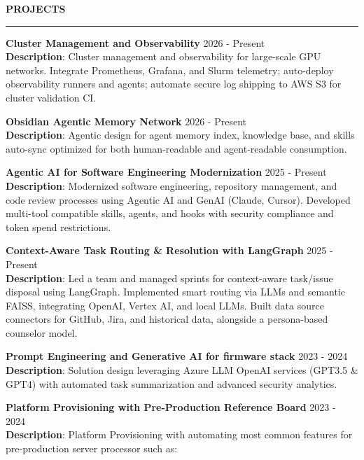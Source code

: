 \documentclass{resume} %
\renewenvironment{rSection}[1]{ %
  \sectionskip
  \textcolor{primaryColor}{\MakeUppercase{\bf #1}} %
  \sectionlineskip
  {\color{primaryColor}\hrule} %
  \begin{list}{}{ %
    \setlength{\leftmargin}{1.5em} %
  }
  \item[]
}{
  \end{list}
}
\begin{document}
\begin{rSection}{Projects}

{\textbf{\textcolor{accentColor}{Cluster Management and Observability}}} \hfill {2026 - Present}\\
\textbf{Description}: Cluster management and observability for large-scale GPU networks. Integrate Prometheus, Grafana, and Slurm telemetry; auto-deploy observability runners and agents; automate secure log shipping to AWS S3 for cluster validation CI.

{\textbf{\textcolor{accentColor}{Obsidian Agentic Memory Network}}} \hfill {2026 - Present}\\
\textbf{Description}: Agentic design for agent memory index, knowledge base, and skills auto-sync optimized for both human-readable and agent-readable consumption.

{\textbf{\textcolor{accentColor}{Agentic AI for Software Engineering Modernization}}} \hfill {2025 - Present}\\
\textbf{Description}: Modernized software engineering, repository management, and code review processes using Agentic AI and GenAI (Claude, Cursor). Developed multi-tool compatible skills, agents, and hooks with security compliance and token spend restrictions.

{\textbf{\textcolor{accentColor}{Context-Aware Task Routing \& Resolution with LangGraph}}} \hfill {2025 - Present}\\
\textbf{Description}: Led a team and managed sprints for context-aware task/issue disposal using LangGraph. Implemented smart routing via LLMs and semantic FAISS, integrating OpenAI, Vertex AI, and local LLMs. Built data source connectors for GitHub, Jira, and historical data, alongside a persona-based counselor model.

{\textbf{\textcolor{accentColor}{Prompt Engineering and Generative AI for firmware stack}}} \hfill {2023 - 2024}\\
\textbf{Description}: Solution design leveraging Azure LLM OpenAI services (GPT3.5 \& GPT4) with automated task summarization and advanced security analytics.

{\textbf{\textcolor{accentColor}{Platform Provisioning with Pre-Production Reference Board}}} \hfill {2023 - 2024}\\
\textbf{Description}: Platform Provisioning with automating most common features for pre-production server processor such as:


\end{rSection}
\end{document}
